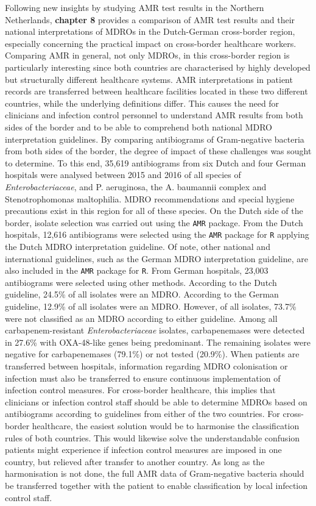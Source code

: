 \documentclass[
]{book}
\begin{document}
Following new insights by studying AMR test results in the Northern Netherlands, \textbf{chapter 8} provides a comparison of AMR test results and their national interpretations of MDROs in the Dutch-German cross-border region, especially concerning the practical impact on cross-border healthcare workers. Comparing AMR in general, not only MDROs, in this cross-border region is particularly interesting since both countries are characterised by highly developed but structurally different healthcare systems. AMR interpretations in patient records are transferred between healthcare facilities located in these two different countries, while the underlying definitions differ. This causes the need for clinicians and infection control personnel to understand AMR results from both sides of the border and to be able to comprehend both national MDRO interpretation guidelines. By comparing antibiograms of Gram-negative bacteria from both sides of the border, the degree of impact of these challenges was sought to determine. To this end, 35,619 antibiograms from six Dutch and four German hospitals were analysed between 2015 and 2016 of all species of \emph{Enterobacteriaceae}, and P. aeruginosa, the A. baumannii complex and Stenotrophomonas maltophilia. MDRO recommendations and special hygiene precautions exist in this region for all of these species. On the Dutch side of the border, isolate selection was carried out using the \texttt{AMR} package. From the Dutch hospitals, 12,616 antibiograms were selected using the \texttt{AMR} package for \texttt{R} applying the Dutch MDRO interpretation guideline. Of note, other national and international guidelines, such as the German MDRO interpretation guideline, are also included in the \texttt{AMR} package for \texttt{R}. From German hospitals, 23,003 antibiograms were selected using other methods. According to the Dutch guideline, 24.5\% of all isolates were an MDRO. According to the German guideline, 12.9\% of all isolates were an MDRO. However, of all isolates, 73.7\% were not classified as an MDRO according to either guideline. Among all carbapenem-resistant \emph{Enterobacteriaceae} isolates, carbapenemases were detected in 27.6\% with OXA-48-like genes being predominant. The remaining isolates were negative for carbapenemases (79.1\%) or not tested (20.9\%). When patients are transferred between hospitals, information regarding MDRO colonisation or infection must also be transferred to ensure continuous implementation of infection control measures. For cross-border healthcare, this implies that clinicians or infection control staff should be able to determine MDROs based on antibiograms according to guidelines from either of the two countries. For cross-border healthcare, the easiest solution would be to harmonise the classification rules of both countries. This would likewise solve the understandable confusion patients might experience if infection control measures are imposed in one country, but relieved after transfer to another country. As long as the harmonisation is not done, the full AMR data of Gram-negative bacteria should be transferred together with the patient to enable classification by local infection control staff.
\end{document}
